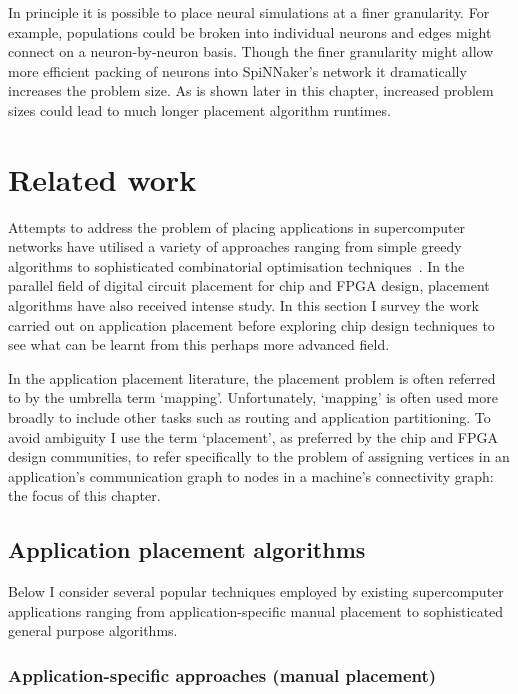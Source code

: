 		In principle it is possible to place neural simulations at a finer
		granularity. For example, populations could be broken into individual
		neurons and edges might connect on a neuron-by-neuron basis. Though the
		finer granularity might allow more efficient packing of neurons into
		SpiNNaker's network it dramatically increases the problem size. As is shown
		later in this chapter, increased problem sizes could lead to much longer
		placement algorithm runtimes.
	
	\section{Related work}
		
		Attempts to address the problem of placing applications in supercomputer
		networks have utilised a variety of approaches ranging from simple greedy
		algorithms to sophisticated combinatorial optimisation
		techniques~\cite{jeannot14}. In the parallel field of digital circuit
		placement for chip and FPGA design, placement algorithms have also received
		intense study.  In this section I survey the work carried out on
		application placement before exploring chip design techniques to see what
		can be learnt from this perhaps more advanced field.
		
		In the application placement literature, the placement problem is often
		referred to by the umbrella term `mapping'. Unfortunately, `mapping' is
		often used more broadly to include other tasks such as routing and
		application partitioning. To avoid ambiguity I use the term `placement', as
		preferred by the chip and FPGA design communities, to refer specifically to
		the problem of assigning vertices in an application's communication graph
		to nodes in a machine's connectivity graph: the focus of this chapter.
		
		\subsection{Application placement algorithms}
			
			Below I consider several popular techniques employed by existing
			supercomputer applications ranging from application-specific manual
			placement to sophisticated general purpose algorithms.
			
			\subsubsection{Application-specific approaches (manual placement)}
				
